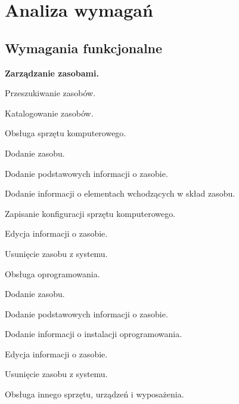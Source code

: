 \section{Analiza wymagań}

\subsection{Wymagania funkcjonalne}

\begin{myEnumerate}
\item \textbf{Zarządzanie zasobami.}
	\begin{myEnumerate}
	\item Przeszukiwanie zasobów.
	\item Katalogowanie zasobów.
	\begin{myEnumerate}
	\item Obsługa sprzętu komputerowego.
	\begin{myEnumerate}
		\item Dodanie zasobu.
		\begin{myEnumerate}
		\item Dodanie podstawowych informacji o zasobie.
		\item Dodanie informacji o elementach wchodzących w skład zasobu.
		\item Zapisanie konfiguracji sprzętu komputerowego.
		\end{myEnumerate}
		\end{myEnumerate}
		\item Edycja informacji o zasobie.
		\item Usunięcie zasobu z systemu.
	\end{myEnumerate}
	\item Obsługa oprogramowania.
	\begin{myEnumerate}
		\item Dodanie zasobu.
		\begin{myEnumerate}
			\item Dodanie podstawowych informacji o zasobie.
			\item Dodanie informacji o instalacji oprogramowania.
		\end{myEnumerate}
		\item Edycja informacji o zasobie.
		\item Usunięcie zasobu z systemu.
	\end{myEnumerate}
	\item Obsługa innego sprzętu, urządzeń i wyposażenia.
	\begin{myEnumerate}

\end{myEnumerate}
\end{myEnumerate}
\end{myEnumerate}
